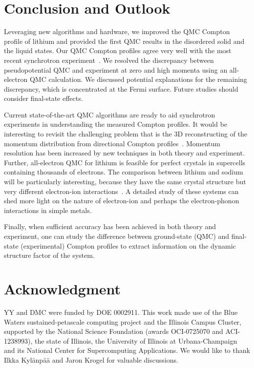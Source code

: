 \documentclass[aps,prb,showpacs,preprintnumbers,amsmath,amssymb,superscriptaddress,twocolumn]{revtex4-1}
\begin{document}

\section{Conclusion and Outlook}

Leveraging new algorithms and hardware, we improved the QMC Compton profile of lithium and provided the first QMC results in the disordered solid and the liquid states. Our QMC Compton profiles agree very well with the most recent synchrotron experiment~\cite{Nozomu2019}. We resolved the discrepancy between pseudopotential QMC and experiment at zero and high momenta using an all-electron QMC calculation. We discussed potential explanations for the remaining discrepancy, which is concentrated at the Fermi surface. Future studies should consider final-state effects.

Current state-of-the-art QMC algorithms are ready to aid synchrotron experiments in understanding the measured Compton profiles. It would be interesting to revisit the challenging problem that is the 3D reconstructing of the momentum distribution from directional Compton profiles~\cite{Schulke1996,Tanaka2001}. Momentum resolution has been increased by new techniques in both theory and experiment. Further, all-electron QMC for lithium is feasible for perfect crystals in supercells containing thousands of electrons. The comparison between lithium and sodium will be particularly interesting, because they have the same crystal structure but very different electron-ion interactions~\cite{Eisenberger1972}. A detailed study of these systems can shed more light on the nature of electron-ion and perhaps the electron-phonon interactions in simple metals.

Finally, when sufficient accuracy has been achieved in both theory and experiment, one can study the difference between ground-state (QMC) and final-state (experimental) Compton profiles to extract information on the dynamic structure factor of the system.

\section{Acknowledgment}

YY and DMC were funded by DOE 0002911. This work made use of the Blue Waters sustained-petascale computing project and the Illinois Campus Cluster, supported by the National Science Foundation (awards OCI-0725070 and ACI-1238993), the state of Illinois, the University of Illinois at Urbana-Champaign and its National Center for Supercomputing Applications.
We would like to thank Ilkka Kyl\"anp\"a\"a and Jaron Krogel for valuable discussions.



\end{document}
